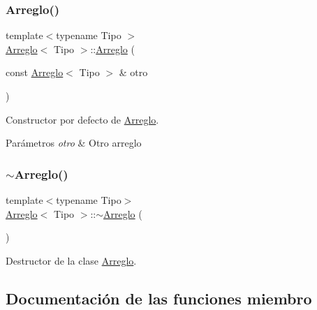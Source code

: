 \subsubsection{\texorpdfstring{Arreglo()}{Arreglo()}\hspace{0.1cm}{\footnotesize\ttfamily [3/3]}}
{\footnotesize\ttfamily template$<$typename Tipo $>$ \\
\hyperlink{class_arreglo}{Arreglo}$<$ Tipo $>$\+::\hyperlink{class_arreglo}{Arreglo} (\begin{DoxyParamCaption}\item[{const \hyperlink{class_arreglo}{Arreglo}$<$ Tipo $>$ \&}]{otro }\end{DoxyParamCaption})}



Constructor por defecto de \hyperlink{class_arreglo}{Arreglo}. 


\begin{DoxyParams}{Parámetros}
{\em otro} & Otro arreglo \\
\hline
\end{DoxyParams}
\mbox{\label{class_arreglo_a1f22e8ac100a6dcc3e18f7850bde7b0a}} 
\subsubsection{\texorpdfstring{$\sim$\+Arreglo()}{~Arreglo()}}
{\footnotesize\ttfamily template$<$typename Tipo$>$ \\
\hyperlink{class_arreglo}{Arreglo}$<$ Tipo $>$\+::$\sim$\hyperlink{class_arreglo}{Arreglo} (\begin{DoxyParamCaption}{ }\end{DoxyParamCaption})\hspace{0.3cm}{\ttfamily [inline]}}



Destructor de la clase \hyperlink{class_arreglo}{Arreglo}. 



\subsection{Documentación de las funciones miembro}
\mbox{\label{class_arreglo_a3520ce3d2a9d701d5a4543897be362c0}} 
